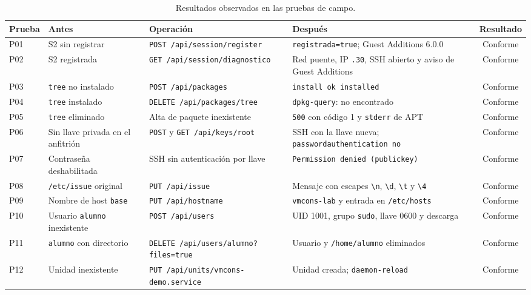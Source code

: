 \begin{table}[!t]
  \centering
  \caption{Resultados observados en las pruebas de campo.}
  \label{tab:resultados-campo}
  \scriptsize
  \begin{tabularx}{\textwidth}{@{}l >{\hsize=0.8\hsize}X >{\hsize=0.9\hsize}X >{\hsize=1.3\hsize}X c@{}}
    \hline
    Prueba & Antes & Operación & Después & Resultado \\
    \hline
    P01 & S2 sin registrar & \texttt{POST /api/session/register} & \texttt{registrada=true}; Guest Additions 6.0.0 & Conforme \\
    P02 & S2 registrada & \texttt{GET /api/session/diagnostico} & Red puente, IP \texttt{.30}, SSH abierto y aviso de Guest Additions & Conforme \\
    P03 & \texttt{tree} no instalado & \texttt{POST /api/packages} & \texttt{install ok installed} & Conforme \\
    P04 & \texttt{tree} instalado & \texttt{DELETE /api/packages/tree} & \texttt{dpkg-query}: no encontrado & Conforme \\
    P05 & \texttt{tree} eliminado & Alta de paquete inexistente & \texttt{500} con código 1 y \texttt{stderr} de APT & Conforme \\
    P06 & Sin llave privada en el anfitrión & \texttt{POST} y \texttt{GET /api/keys/root} & SSH con la llave nueva; \texttt{passwordauthentication no} & Conforme \\
    P07 & Contraseña deshabilitada & SSH sin autenticación por llave & \texttt{Permission denied (publickey)} & Conforme \\
    P08 & \texttt{/etc/issue} original & \texttt{PUT /api/issue} & Mensaje con escapes \texttt{\textbackslash n}, \texttt{\textbackslash d}, \texttt{\textbackslash t} y \texttt{\textbackslash 4} & Conforme \\
    P09 & Nombre de host \texttt{base} & \texttt{PUT /api/hostname} & \texttt{vmcons-lab} y entrada en \texttt{/etc/hosts} & Conforme \\
    P10 & Usuario \texttt{alumno} inexistente & \texttt{POST /api/users} & UID 1001, grupo \texttt{sudo}, llave 0600 y descarga & Conforme \\
    P11 & \texttt{alumno} con directorio & \texttt{DELETE /api/\allowbreak users/\allowbreak alumno?files=true} & Usuario y \texttt{/home/alumno} eliminados & Conforme \\
    P12 & Unidad inexistente & \texttt{PUT /api/units/vmcons-demo.service} & Unidad creada; \texttt{daemon-reload} & Conforme \\

\end{tabularx}
\end{table}
